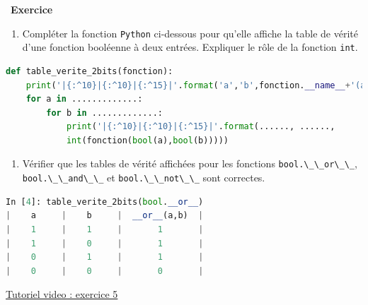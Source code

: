 \documentclass[
  11pt,
]{article}
\newcommand{\passthrough}[1]{#1}
\providecommand{\tightlist}{%
  \setlength{\itemsep}{0pt}\setlength{\parskip}{0pt}}
\newcounter{exo}
\newenvironment{exercice}[1]
{\par \medskip   \addtocounter{exo}{1} \noindent  
\begin{bclogo}[arrondi =0.1,   noborder = true, logo=\bccrayon, marge=4]{~\textbf{Exercice} \textbf{\theexo} {\itshape #1} }  \par}
{
\end{bclogo}
 \par \bigskip }
\newcounter{def}
\begin{document}
\begin{exercice}{}

\begin{enumerate}
\def\labelenumi{\arabic{enumi}.}
\tightlist
\item
  Compléter la fonction \passthrough{\lstinline!Python!} ci-dessous pour
  qu'elle affiche la table de vérité d'une fonction booléenne à deux
  entrées. Expliquer le rôle de la fonction
  \passthrough{\lstinline!int!}.
\end{enumerate}

\begin{lstlisting}[language=Python]
def table_verite_2bits(fonction):
    print('|{:^10}|{:^10}|{:^15}|'.format('a','b',fonction.__name__+'(a,b)'))
    for a in .............:
        for b in .............:
            print('|{:^10}|{:^10}|{:^15}|'.format(......, ......, 
            int(fonction(bool(a),bool(b)))))
\end{lstlisting}

\begin{enumerate}
\def\labelenumi{\arabic{enumi}.}
\setcounter{enumi}{1}
\tightlist
\item
  Vérifier que les tables de vérité affichées pour les fonctions
  \passthrough{\lstinline!bool.\_\_or\_\_!},
  \passthrough{\lstinline!bool.\_\_and\_\_!} et
  \passthrough{\lstinline!bool.\_\_not\_\_!} sont correctes.
\end{enumerate}

\begin{lstlisting}[language=Python]
In [4]: table_verite_2bits(bool.__or__)                                                                                                                                           
|    a     |    b     |  __or__(a,b)  |
|    1     |    1     |       1       |
|    1     |    0     |       1       |
|    0     |    1     |       1       |
|    0     |    0     |       0       |
\end{lstlisting}

\href{videos/exercice5.mp4}{Tutoriel video : exercice 5}

\end{exercice}
\end{document}
